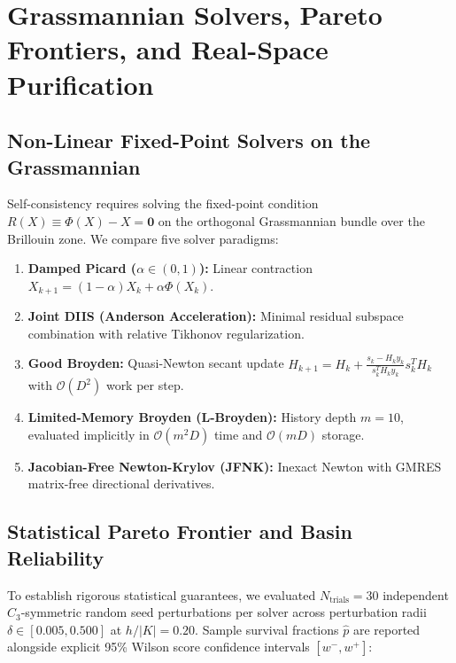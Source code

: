 \section{Grassmannian Solvers, Pareto Frontiers, and Real-Space Purification}
\label{sec:solvers_and_real_space}

\subsection{Non-Linear Fixed-Point Solvers on the Grassmannian}
Self-consistency requires solving the fixed-point condition $R(X) \equiv \Phi(X) - X = \mathbf{0}$ on the orthogonal Grassmannian bundle over the Brillouin zone. We compare five solver paradigms:
\begin{enumerate}
\item \textbf{Damped Picard ($\alpha \in (0, 1)$):} Linear contraction $X_{k+1} = (1-\alpha)X_k + \alpha \Phi(X_k)$.
\item \textbf{Joint DIIS (Anderson Acceleration):} Minimal residual subspace combination with relative Tikhonov regularization.
\item \textbf{Good Broyden:} Quasi-Newton secant update $H_{k+1} = H_k + \frac{s_k - H_k y_k}{s_k^T H_k y_k} s_k^T H_k$ with $\mathcal{O}(D^2)$ work per step.
\item \textbf{Limited-Memory Broyden (L-Broyden):} History depth $m=10$, evaluated implicitly in $\mathcal{O}(m^2 D)$ time and $\mathcal{O}(mD)$ storage.
\item \textbf{Jacobian-Free Newton-Krylov (JFNK):} Inexact Newton with GMRES matrix-free directional derivatives.
\end{enumerate}

\subsection{Statistical Pareto Frontier and Basin Reliability}
To establish rigorous statistical guarantees, we evaluated $N_{\mathrm{trials}} = 30$ independent $C_3$-symmetric random seed perturbations per solver across perturbation radii $\delta \in [0.005, 0.500]$ at $h/|K| = 0.20$.
Sample survival fractions $\hat{p}$ are reported alongside explicit 95\% Wilson score confidence intervals $[w^-, w^+]$:

